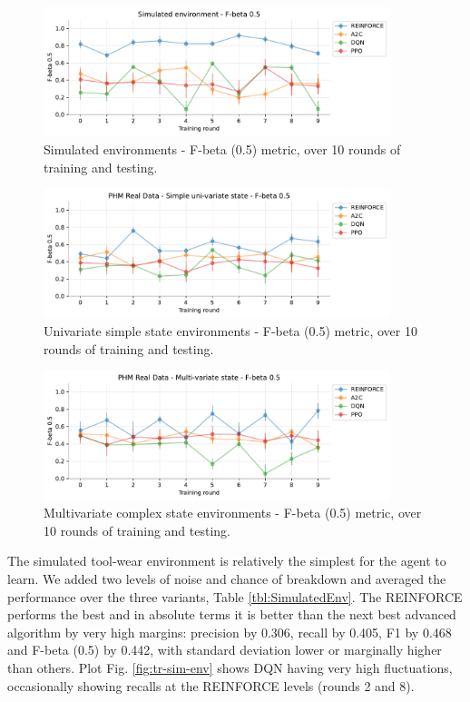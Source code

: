 \documentclass[a4paper, 12pt]{article}
\begin{document}
\begin{figure}[h]
	\centering
	\includegraphics[width=0.9\textwidth]{Simulated_F05.pdf}  
	\caption{Simulated environments - F-beta (0.5) metric, over 10 rounds of training and testing.}
	\label{fig:FbetaSimulated}
\end{figure}

\begin{figure}[h]
	\centering
	\includegraphics[width=0.9\textwidth]{Singevariable_F05.pdf}  
	\caption{Univariate simple state environments - F-beta (0.5) metric, over 10 rounds of training and testing.}
	\label{fig:FbetaPHMSS}
\end{figure}

\begin{figure}[h]
	\centering
	\includegraphics[width=0.9\textwidth]{Multivariate_F05.pdf}  
	\caption{Multivariate complex state environments - F-beta (0.5) metric, over 10 rounds of training and testing.}
	\label{fig:FbetaPHMMS}
\end{figure}

The simulated tool-wear environment is relatively the simplest for the agent to learn. We added two levels of noise and chance of breakdown and averaged the performance over the three variants, Table \ref{tbl:SimulatedEnv}. The REINFORCE performs the best and in absolute terms it is better than the next best advanced algorithm by very high margins: precision by 0.306, recall by 0.405, F1 by 0.468 and F-beta (0.5) by 0.442, with standard deviation lower or marginally higher than others. Plot Fig. \ref{fig:tr-sim-env} shows DQN having very high fluctuations, occasionally showing recalls at the REINFORCE levels (rounds 2 and 8).
\end{document}
